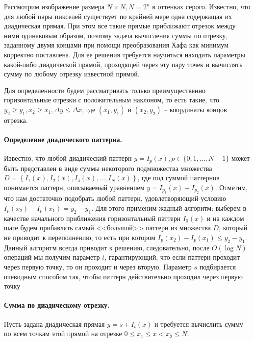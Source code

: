 
Рассмотрим изображение размера $N \times N, N = 2^n$ в оттенках серого. Известно, что для любой пары пикселей существует по крайней мере одна содержащая их диадическая прямая. При этом все такие прямые приближают отрезок между ними одинаковым образом, поэтому задача вычисления суммы по отрезку, заданному двумя концами при помощи преобразования Хафа как минимум корректно поставлена. Для ее решения требуется научиться находить параметры какой-либо диадической прямой, проходящей через эту пару точек и вычислять сумму по любому отрезку известной прямой.

Для определенности будем рассматривать только преимущественно горизонтальные отрезки с положительным наклоном, то есть такие, что $y_2 \ge y_1, x_2 \ge x_1, \Delta y \le \Delta x$, где $(x_1, y_1)$ и $(x_2, y_2)$ -- координаты концов отрезка.

\paragraph{Определение диадического паттерна.}
Известно, что любой диадический паттерн $y = I_p(x), p \in \{ 0, 1, \dots, N-1\}$ может быть представлен в виде суммы некоторого подмножества множества $D = \left\{ I_1(x), I_2(x), I_4(x), \dots, I_N(x) \right\}$, где под суммой паттернов понимается паттерн, описываемый уравнением $y = I_{p_1}(x) + I_{p_2}(x)$. Отметим, что нам достаточно подобрать любой паттерн, удовлетворяющий условию $I_p\left( x_2 \right) - I_p\left( x_1 \right) = y_2 - y_1$. Для этого применим жадный алгоритм: выберем в качестве начального приближения горизонтальный паттерн $I_0(x)$ и на каждом шаге будем прибавлять самый <<большой>> паттерн из множества $D$, который не приводит к переполнению, то есть при котором $I_p\left( x_2 \right) - I_p\left( x_1 \right) \le y_2 - y_1$. Данный алгоритм всегда приводит к решению, следовательно, после $O\left( \log N \right)$ операций мы получим параметр $t$, гарантирующий, что если паттерн проходит через первую точку, то он проходит и через вторую. Параметр $s$ подбирается очевидным способом так, чтобы паттерн действительно проходил через первую точку

\paragraph{Сумма по диадическому отрезку.}
Пусть задана диадическая прямая $y = s + I_t(x)$ и требуется вычислить сумму по всем точкам этой прямой на отрезке $0 \le x_1 \le x < x_2 \le N$.

